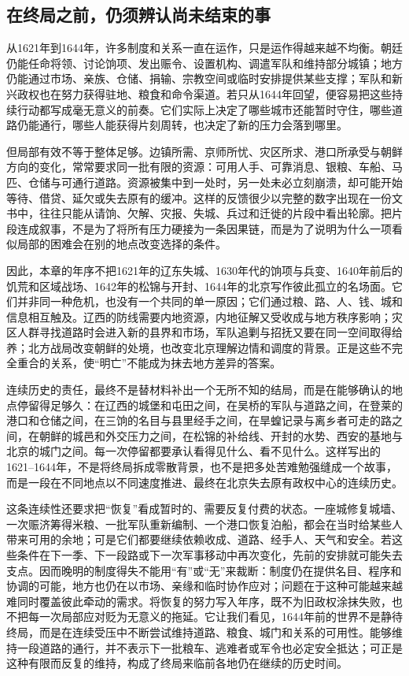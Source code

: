 \subsection{在终局之前，仍须辨认尚未结束的事}

从1621年到1644年，许多制度和关系一直在运作，只是运作得越来越不均衡。朝廷仍能任命将领、讨论饷项、发出赈令、设置机构、调遣军队和维持部分城镇；地方仍能通过市场、亲族、仓储、捐输、宗教空间或临时安排提供某些支撑；军队和新兴政权也在努力获得驻地、粮食和命令渠道。若只从1644年回望，便容易把这些持续行动都写成毫无意义的前奏。它们实际上决定了哪些城市还能暂时守住，哪些道路仍能通行，哪些人能获得片刻周转，也决定了新的压力会落到哪里。

但局部有效不等于整体足够。边镇所需、京师所忧、灾区所求、港口所承受与朝鲜方向的变化，常常要求同一批有限的资源：可用人手、可靠消息、银粮、车船、马匹、仓储与可通行道路。资源被集中到一处时，另一处未必立刻崩溃，却可能开始等待、借贷、延欠或失去原有的缓冲。这样的反馈很少以完整的数字出现在一份文书中，往往只能从请饷、欠解、灾报、失城、兵过和迁徙的片段中看出轮廓。把片段连成叙事，不是为了将所有压力硬接为一条因果链，而是为了说明为什么一项看似局部的困难会在别的地点改变选择的条件。

因此，本章的年序不把1621年的辽东失城、1630年代的饷项与兵变、1640年前后的饥荒和区域战场、1642年的松锦与开封、1644年的北京写作彼此孤立的名场面。它们并非同一种危机，也没有一个共同的单一原因；它们通过粮、路、人、钱、城和信息相互触及。辽西的防线需要内地资源，内地征解又受收成与地方秩序影响；灾区人群寻找道路时会进入新的县界和市场，军队追剿与招抚又要在同一空间取得给养；北方战局改变朝鲜的处境，也改变北京理解边情和调度的背景。正是这些不完全重合的关系，使“明亡”不能成为抹去地方差异的答案。

连续历史的责任，最终不是替材料补出一个无所不知的结局，而是在能够确认的地点停留得足够久：在辽西的城堡和屯田之间，在吴桥的军队与道路之间，在登莱的港口和仓储之间，在三饷的名目与县里经手之间，在旱蝗记录与离乡者可走的路之间，在朝鲜的城邑和外交压力之间，在松锦的补给线、开封的水势、西安的基地与北京的城门之间。每一次停留都要承认看得见什么、看不见什么。这样写出的1621--1644年，不是将终局拆成零散背景，也不是把多处苦难勉强缝成一个故事，而是一段在不同地点以不同速度推进、最终在北京失去原有政权中心的连续历史。

这条连续性还要求把“恢复”看成暂时的、需要反复付费的状态。一座城修复城墙、一次赈济筹得米粮、一批军队重新编制、一个港口恢复泊船，都会在当时给某些人带来可用的余地；可是它们都要继续依赖收成、道路、经手人、天气和安全。若这些条件在下一季、下一段路或下一次军事移动中再次变化，先前的安排就可能失去支点。因而晚明的制度得失不能用“有”或“无”来裁断：制度仍在提供名目、程序和协调的可能，地方也仍在以市场、亲缘和临时协作应对；问题在于这种可能越来越难同时覆盖彼此牵动的需求。将恢复的努力写入年序，既不为旧政权涂抹失败，也不把每一次局部应对贬为无意义的拖延。它让我们看见，1644年前的世界不是静待终局，而是在连续受压中不断尝试维持道路、粮食、城门和关系的可用性。能够维持一段道路的通行，并不表示下一批粮车、逃难者或军令也必定安全抵达；可正是这种有限而反复的维持，构成了终局来临前各地仍在继续的历史时间。


